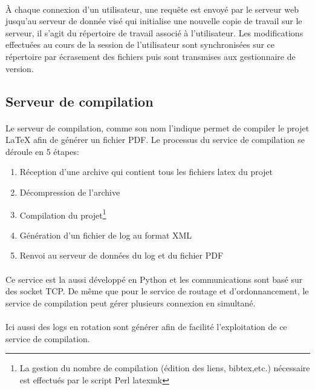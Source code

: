 \documentclass[a4paper,12pt]{article}
\begin{document}
\paragraph{}
\`A chaque connexion d'un utilisateur, une requête est envoyé par le serveur web jusqu'au serveur de donnée visé qui initialise une nouvelle copie de travail sur le serveur, il s'agit du répertoire de travail associé à l'utilisateur.
Les modifications effectuées au cours de la session de l'utilisateur sont synchronisées sur ce répertoire par écrasement des fichiers puis sont transmises aux gestionnaire de version.

\subsection{Serveur de compilation}
\paragraph*{}
Le serveur de compilation, comme son nom l'indique permet de compiler le projet LaTeX afin de générer un fichier PDF. Le processus du service de compilation se déroule en 5 étapes:
\begin{enumerate}
 \item Réception d'une archive qui contient tous les fichiers latex du projet
 \item Décompression de l'archive
 \item Compilation du projet\footnote{La gestion du nombre de compilation (édition des liens, bibtex,etc.) nécessaire est effectués par le script Perl latexmk}
 \item Génération d'un fichier de log au format XML
 \item Renvoi au serveur de données du log et du fichier PDF
\end{enumerate}

\paragraph*{}
Ce service est la aussi développé en Python et les communications sont basé sur des socket TCP. De même que pour le service de routage et d'ordonnancement, le service de compilation peut gérer plusieurs connexion en simultané.

\paragraph*{}
Ici aussi des logs en rotation sont générer afin de facilité l'exploitation de ce service de compilation.
\end{document}
